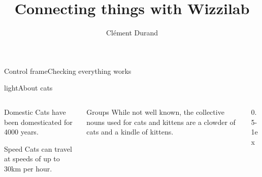 \documentclass[aspectratio=169]{beamer}
\title[Stage de seconde année à l'École polytechnique]
      {Connecting things with Wizzilab}
      [Wizzilab]
\author{Clément Durand}
\begin{document}
\maketitle



\begin{frame}{Control frame}{Checking everything works}
  \lipsum[1]
\end{frame}

\begin{picframe}[lightbw]{light}{About cats}
  \begin{columns}[t,onlytextwidth]
    \begin{column}{0.25\textwidth}
      \begin{block}{Domestic}
        Cats have been domesticated for 4000 years.
      \end{block}
      \begin{block}{Speed}
        Cats can travel at speeds of up to 30km per hour.
      \end{block}
    \end{column}
    \begin{column}{0.25\textwidth}
      \begin{block}{Groups}
        While not well known, the collective nouns used for cats and kittens are a clowder of cats and a kindle of kittens.
        \vspace*{5ex}
      \end{block}
    \end{column}
    \begin{column}{0.5\textwidth-1ex}
    \end{column}
  \end{columns}
\end{picframe}
\end{document}
